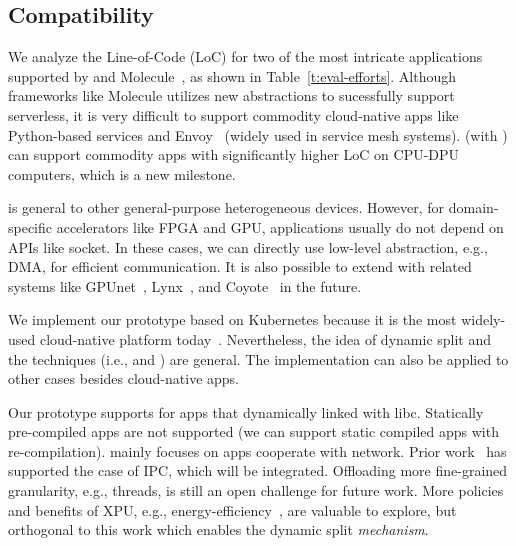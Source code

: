 

\subsection{Compatibility}
We analyze the Line-of-Code (LoC) for two of the most intricate applications supported by \sys and Molecule~\cite{10.1145/3503222.3507732},
as shown in Table~\ref{t:eval-efforts}. 
Although frameworks like Molecule utilizes new abstractions to sucessfully support serverless, it is very difficult to support commodity cloud-native apps like Python-based services and Envoy~\cite{envoy} (widely used in service mesh systems).
\sys (with \os) can support commodity apps with significantly higher LoC on CPU-DPU computers,
which is a new milestone.


\os is general to other general-purpose heterogeneous devices.
However, for domain-specific accelerators like FPGA and GPU, applications usually do not depend on APIs like socket.
In these cases, we can directly use low-level abstraction, e.g., DMA, for efficient communication.
It is also possible to extend \os with related systems like GPUnet~\cite{kim2014gpunet}, Lynx~\cite{tork2020lynx}, and Coyote~\cite{korolija2020abstractions} in the future.


We implement our prototype based on Kubernetes because it is the most widely-used cloud-native platform today~\cite{cncf-landscape}.
Nevertheless, the idea of dynamic split and the techniques (i.e., \giptable and \gsocket) are general.
The implementation can also be applied to other cases besides cloud-native apps.


Our prototype supports \gsocket for apps that dynamically linked with libc.
Statically pre-compiled apps are not supported (we can support static compiled apps with re-compilation).
\os mainly focuses on apps cooperate with network.
Prior work~\cite{10.1145/3503222.3507732} has supported the case of IPC, which will be integrated.
Offloading more fine-grained granularity, e.g., threads, is still an open challenge for future work.
More policies and benefits of XPU, e.g., energy-efficiency~\cite{234944}, are valuable to explore, but orthogonal to this work which enables the dynamic split \emph{mechanism}.

